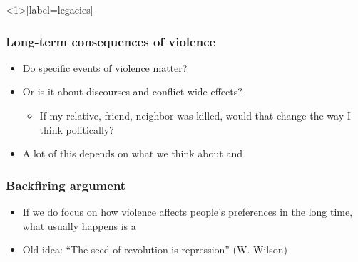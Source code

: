 \documentclass[aspectratio=43]{beamer}
\begin{document}

\begin{frame}<1>[label=legacies]
\frametitle{Long-term consequences of violence}
\centering

\begin{itemize}[<+->]
\item Do specific events of violence matter?
\item Or is it about discourses and conflict-wide effects?
  \begin{itemize}
    \item If my relative, friend, neighbor was killed, would that change the way I think politically?
  \end{itemize}
\item A lot of this depends on what we think about {\color{red}{how wartime violence happens}} and {\color{red}{whether what happens in a war leaves legacies}}
\end{itemize}

\end{frame}

\begin{frame}
\frametitle{Backfiring argument}
\centering

\begin{itemize}[<+->]
  \item If we do focus on how violence affects people's preferences in the long time, what usually happens is a {\color{red}{backfiring effect}}
  \item Old idea: ``The seed of revolution is repression'' (W. Wilson)
\end{itemize}

\end{frame}
\end{document}

